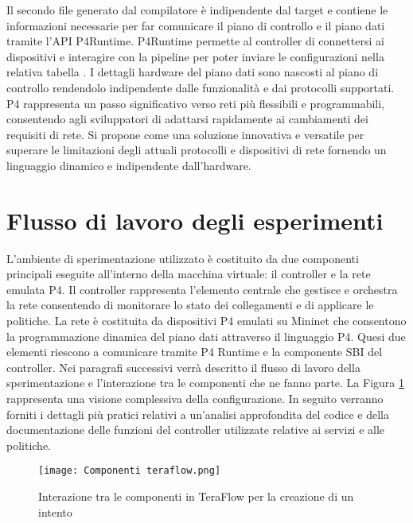 \newline Il secondo file generato dal compilatore è indipendente dal target e 
contiene le informazioni necessarie per far comunicare il piano di controllo e il piano dati tramite l'API P4Runtime.
\newline P4Runtime permette al controller di connettersi ai dispositivi e interagire con la pipeline 
per poter inviare le configurazioni nella relativa tabella \cite{p4Article}. 
I dettagli hardware del piano dati sono nascosti al piano di controllo rendendolo indipendente dalle funzionalità e dai protocolli supportati.
P4 rappresenta un passo significativo verso reti più flessibili e programmabili, consentendo agli sviluppatori di adattarsi rapidamente ai cambiamenti dei requisiti di rete.
Si propone come una soluzione innovativa e versatile per superare le limitazioni degli attuali protocolli e dispositivi di rete fornendo un linguaggio dinamico e indipendente dall'hardware.

\section{Flusso di lavoro degli esperimenti}
L'ambiente di sperimentazione utilizzato è costituito da due componenti principali eseguite all'interno della macchina virtuale: il controller e la rete emulata P4.
Il controller rappresenta l'elemento centrale che gestisce e orchestra la rete consentendo di monitorare lo stato dei collegamenti
e di applicare le politiche.
La rete è costituita da dispositivi P4 emulati su Mininet che consentono la programmazione dinamica del piano dati attraverso il linguaggio P4.
Quesi due elementi riescono a comunicare tramite P4 Runtime e la componente SBI del controller.
\newline Nei paragrafi successivi verrà descritto
il flusso di lavoro della sperimentazione e l'interazione tra le componenti che ne fanno parte.
La Figura \ref{fig:componenti} rappresenta una visione complessiva della configurazione.
In seguito verranno forniti i dettagli più pratici relativi a un'analisi approfondita del codice e della documentazione delle funzioni del controller utilizzate relative ai servizi e alle politiche.
\begin{figure}[h]
    \centering
   \texttt{[image: Componenti teraflow.png]}
    \caption{Interazione tra le componenti in TeraFlow per la creazione di un intento}
    \label{fig:componenti}
\end{figure}
